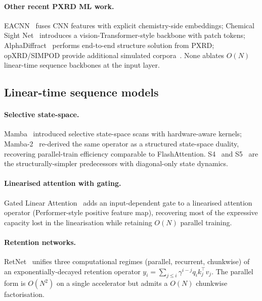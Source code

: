 \documentclass[final]{ws-ijwmip}
\begin{document}
\paragraph{Other recent PXRD ML work.}
EACNN~\cite{anonymous2025eacnn} fuses CNN features with explicit
chemistry-side embeddings; Chemical Sight
Net~\cite{anonymous2025chemsight} introduces a vision-Transformer-style
backbone with patch tokens; AlphaDiffract~\cite{anonymous2025alphadiffract}
performs end-to-end structure solution from PXRD; opXRD/SIMPOD provide
additional simulated corpora~\cite{anonymous2025opxrd,anonymous2025simpod}.
None ablates $O(N)$ linear-time sequence backbones at the input layer.


\subsection{Linear-time sequence models}

\paragraph{Selective state-space.}
Mamba~\cite{gu2023mamba} introduced selective state-space scans with
hardware-aware kernels; Mamba-2~\cite{gu2024mamba2} re-derived the same
operator as a structured state-space duality, recovering parallel-train
efficiency comparable to FlashAttention. S4~\cite{gu2022s4} and
S5~\cite{smith2023s5} are the structurally-simpler predecessors with
diagonal-only state dynamics.

\paragraph{Linearised attention with gating.}
Gated Linear Attention~\cite{yang2023gla} adds an input-dependent gate
to a linearised attention operator (Performer-style positive feature
map), recovering most of the expressive capacity lost in the
linearisation while retaining $O(N)$ parallel training.

\paragraph{Retention networks.}
RetNet~\cite{sun2023retnet} unifies three computational regimes
(parallel, recurrent, chunkwise) of an exponentially-decayed retention
operator $y_i = \sum_{j\leq i} \gamma^{i-j} q_i k_j^\top v_j$. The
parallel form is $O(N^2)$ on a single accelerator but admits a
$O(N)$ chunkwise factorisation.
\end{document}
